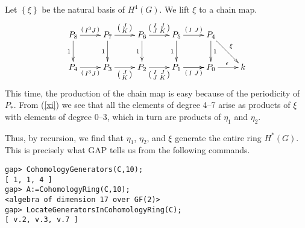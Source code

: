 \documentclass[12pt]{article}
\begin{document}
Let $\left\{\xi\right\}$ be the natural 
basis of $H^4\left(G\right)$.
We lift $\xi$ to a chain map.
\begin{equation}\label{xi}
\vcenter{\begin{xy}\xymatrix{
P_8\ar[r]^{\left(\begin{smallmatrix}I^3J\end{smallmatrix}\right)}
\ar[d]_1
&P_7\ar[r]^{\left(\begin{smallmatrix}J\\K\end{smallmatrix}\right)}
\ar[d]_1
&P_6\ar[r]^{\left(\begin{smallmatrix}I&J\\J&K\end{smallmatrix}\right)}
\ar[d]_1
&P_5\ar[r]^{\left(\begin{smallmatrix}I&J\end{smallmatrix}\right)}
\ar[d]_1
&P_4\ar[rd]^{\xi}\ar[d]^1\\
P_4\ar[r]_{\left(\begin{smallmatrix}I^3J\end{smallmatrix}\right)}
&P_3\ar[r]_{\left(\begin{smallmatrix}J\\K\end{smallmatrix}\right)}
&P_2\ar[r]_{\left(\begin{smallmatrix}I&J\\J&K\end{smallmatrix}\right)}
&P_1\ar[r]_{\left(\begin{smallmatrix}I&J\end{smallmatrix}\right)}\ar[r]
&P_0\ar[r]^\epsilon
&k
}\end{xy}}
\end{equation}
This time, the production of the chain map is easy because
of the periodicity of $P_\ast$. 
From (\ref{xi}) we see that all the elements of degree 4--7 
arise as products of $\xi$ with elements of degree
0--3, which in turn are products of $\eta_1$ and $\eta_2$.

Thus, by recursion, we find that 
$\eta_1$, $\eta_2$, and $\xi$ generate the entire ring
$H^\ast\left(G\right)$.
This is precisely what \textsf{GAP} tells us from
the following commands.
\begin{verbatim}
gap> CohomologyGenerators(C,10);
[ 1, 1, 4 ]
gap> A:=CohomologyRing(C,10);
<algebra of dimension 17 over GF(2)>
gap> LocateGeneratorsInCohomologyRing(C);
[ v.2, v.3, v.7 ]
\end{verbatim}
\end{document}
